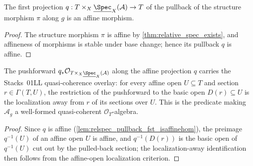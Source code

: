 \begin{lemma}
  \label{lem:relspec_pullback_fst_isaffinehom}
  The first projection
  \(q : T \times_X \underline{\Spec}_X(\mathcal{A}) \to T\) of the pullback of the
  structure morphism \(\pi\) along \(g\) is an affine morphism.
\end{lemma}

\begin{proof}
  The structure morphism \(\pi\) is affine by \cref{thm:relative_spec_exists}, and
  affineness of morphisms is stable under base change; hence its pullback \(q\) is
  affine.
\end{proof}

\begin{lemma}
  \label{lem:relspec_pullback_coequifibered}
  The pushforward \(q_* \mathcal{O}_{T \times_X \underline{\Spec}_X(\mathcal{A})}\)
  along the affine projection \(q\) carries the Stacks~01LL quasi-coherence overlay:
  for every affine open \(U \subseteq T\) and section \(r \in \Gamma(T, U)\), the
  restriction of the pushforward to the basic open \(D(r) \subseteq U\) is the
  localization away from \(r\) of its sections over \(U\). This is the predicate making
  \(\mathcal{A}_g\) a well-formed quasi-coherent \(\mathcal{O}_T\)-algebra.
\end{lemma}

\begin{proof}
  Since \(q\) is affine (\cref{lem:relspec_pullback_fst_isaffinehom}), the preimage
  \(q^{-1}(U)\) of an affine open \(U\) is affine, and \(q^{-1}(D(r))\) is the basic open
  of \(q^{-1}(U)\) cut out by the pulled-back section; the localization-away
  identification then follows from the affine-open localization criterion.
\end{proof}

